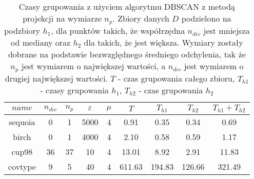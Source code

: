 \begin{table}
	\centering
	\begin{tabular}{ | c | c | c | c |  c | c | c | c | c | }
		\hline
		$ name $ & $ n_{div} $ & $ n_p $ & $ \varepsilon $ & $ \mu $ & $ T $ & $ T_{h1} $ & $ T_{h2} $ & $ T_{h1}+T_{h2} $\\ \hline
		 sequoia  & 0 & 1 & 5000 & 4 & 0.91 & 0.35 & 0.34 & 0.69 \\ \hline
		 birch  & 0 & 1 & 4000 & 4 & 2.10 & 0.58 & 0.59 & 1.17 \\ \hline
		 cup98  & 36 & 37 & 10 & 4 & 13.01 & 8.92 & 2.91 & 11.83 \\ \hline
		covtype & 9 & 5 & 40 & 4 & 611.63 & 194.83 & 126.66 & 321.49 \\ \hline
	\end{tabular}
	\caption{Czasy grupowania z użyciem algorytmu DBSCAN z metodą projekcji na wymiarze $ n_p $. Zbiory danych $ D $ podzielono na podzbiory $ h_1 $, dla punktów takich, że współrzędna $ n_{div} $ jest mniejsza od mediany oraz $ h_2 $ dla takich, że jest większa. Wymiary zostały dobrane na podstawie bezwzględnego średniego odchylenia, tak że $ n_p $ jest wymiarem o największej wartości, a $ n_{div} $ jest wymiarem o drugiej największej wartości. $ T $ - czas grupowania całego zbioru, $ T_{h1} $ - czasy grupowania $ h_1 $, $ T_{h2} $ - czas grupowania $ h_2 $}\label{qscan:projection-space-cut-times}
\end{table}